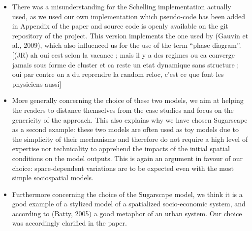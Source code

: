 \documentclass[11pt,a4paper,sans]{moderncv}        %
\begin{document}
\begin{itemize}
	\item There was a misunderstanding for the Schelling implementation actually used, as we used our own implementation which pseudo-code has been added in Appendix of the paper and source code is openly available on the git repository of the project. This version implements the one used by (Gauvin et al., 2009), which also influenced us for the use of the term ``phase diagram''.%
	 [(JR) ah oui cest selon la vacance ; mais il y a des regimes ou ca converge jamais sous forme de cluster et ca reste un etat dynamique sans structure ; oui par contre on a du reprendre la random reloc, c'est ce que font les physiciens aussi]

    \item More generally concerning the choice of these two models, we aim at helping the readers to distance themselves from the case studies and focus on the genericity of the approach. This also explains why we have chosen Sugarscape as a second example: these two models are often used as toy models due to the simplicity of their mechanisms and therefore do not require a high level of expertise nor technicality to apprehend the impacts of the initial spatial conditions on the model outputs. This is again an argument in favour of our choice: space-dependent variations are to be expected even with the most simple sociospatial models.
	
	\item Furthermore concerning the choice of the Sugarscape model, we think it is a good example of a stylized model of a spatialized socio-economic system, and according to (Batty, 2005) a good metaphor of an urban system. Our choice was accordingly clarified in the paper.
	

\end{itemize}
\end{document}
